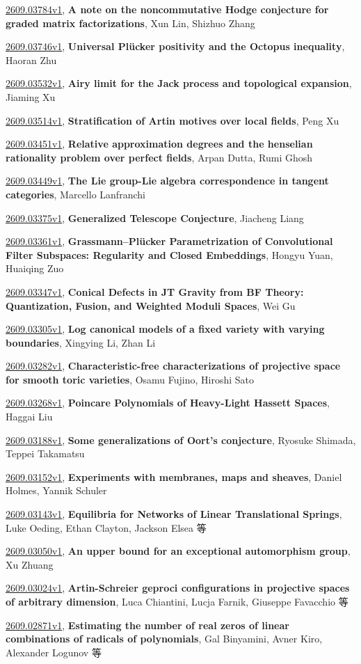 \documentclass[9pt, a4paper]{article}
\theoremstyle{plain}
\theoremstyle{definition}
\theoremstyle{remark}
\newcommand{\arxiv}[3]{\href{https://arxiv.org/abs/#1}{#1}, \textbf{\textcolor{arxivblue}{#2}}, #3}
\begin{document}
\arxiv{2609.03784v1}{A note on the noncommutative Hodge conjecture for graded matrix factorizations}{Xun Lin, Shizhuo Zhang}

\arxiv{2609.03746v1}{Universal Plücker positivity and the Octopus inequality}{Haoran Zhu}

\arxiv{2609.03532v1}{Airy limit for the Jack process and topological expansion}{Jiaming Xu}

\arxiv{2609.03514v1}{Stratification of Artin motives over local fields}{Peng Xu}

\arxiv{2609.03451v1}{Relative approximation degrees and the henselian rationality problem over perfect fields}{Arpan Dutta, Rumi Ghosh}

\arxiv{2609.03449v1}{The Lie group-Lie algebra correspondence in tangent categories}{Marcello Lanfranchi}

\arxiv{2609.03375v1}{Generalized Telescope Conjecture}{Jiacheng Liang}

\arxiv{2609.03361v1}{Grassmann--Plücker Parametrization of Convolutional Filter Subspaces: Regularity and Closed Embeddings}{Hongyu Yuan, Huaiqing Zuo}

\arxiv{2609.03347v1}{Conical Defects in JT Gravity from BF Theory: Quantization, Fusion, and Weighted Moduli Spaces}{Wei Gu}

\arxiv{2609.03305v1}{Log canonical models of a fixed variety with varying boundaries}{Xingying Li, Zhan Li}

\arxiv{2609.03282v1}{Characteristic-free characterizations of projective space for smooth toric varieties}{Osamu Fujino, Hiroshi Sato}

\arxiv{2609.03268v1}{Poincare Polynomials of Heavy-Light Hassett Spaces}{Haggai Liu}

\arxiv{2609.03188v1}{Some generalizations of Oort's conjecture}{Ryosuke Shimada, Teppei Takamatsu}

\arxiv{2609.03152v1}{Experiments with membranes, maps and sheaves}{Daniel Holmes, Yannik Schuler}

\arxiv{2609.03143v1}{Equilibria for Networks of Linear Translational Springs}{Luke Oeding, Ethan Clayton, Jackson Elsea 等}

\arxiv{2609.03050v1}{An upper bound for an exceptional automorphism group}{Xu Zhuang}

\arxiv{2609.03024v1}{Artin-Schreier geproci configurations in projective spaces of arbitrary dimension}{Luca Chiantini, Lucja Farnik, Giuseppe Favacchio 等}

\arxiv{2609.02871v1}{Estimating the number of real zeros of linear combinations of radicals of polynomials}{Gal Binyamini, Avner Kiro, Alexander Logunov 等}
\end{document}
